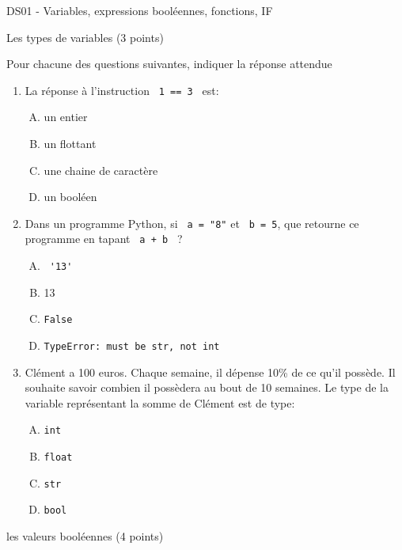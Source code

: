 \documentclass[a4paper,12pt,openany]{book}
\begin{document}
\begin{center}\begin{large}
DS01 - Variables, expressions booléennes, fonctions, IF
\end{large}\end{center}

\exo \qquad Les types de variables \hfill
(3 points)

Pour chacune des questions suivantes, indiquer la réponse attendue

\begin{enumerate}
	\item La réponse à l'instruction \verb+ 1 == 3 + est:
	\begin{enumerate}[A.]
		\item un entier
		\item un flottant
		\item une chaine de caractère
		\item un booléen
	\end{enumerate}		
	
	\medskip
	
	\item Dans un programme Python, si \verb+ a = "8"+ et \verb+ b = 5+, que retourne ce programme en tapant \verb- a + b - ?
	\begin{enumerate}[A.]
		\item \verb+ '13'+
		\item 13
		\item \verb+False+
		\item \verb+TypeError: must be str, not int+
	\end{enumerate}
	
	\medskip
	
	\item Clément a 100 euros. Chaque semaine, il dépense 10\% de ce qu'il possède. Il souhaite savoir combien il possèdera au bout de 10 semaines. Le type de la variable représentant la somme de Clément est de type:
	
	\begin{enumerate}[A.]
		\item \verb+int+
		\item \verb+float+
		\item \verb+str+
		\item \verb+bool+
	\end{enumerate}
\end{enumerate}

\bigskip

\exo \qquad les valeurs booléennes \hfill
(4 points)
\end{document}
